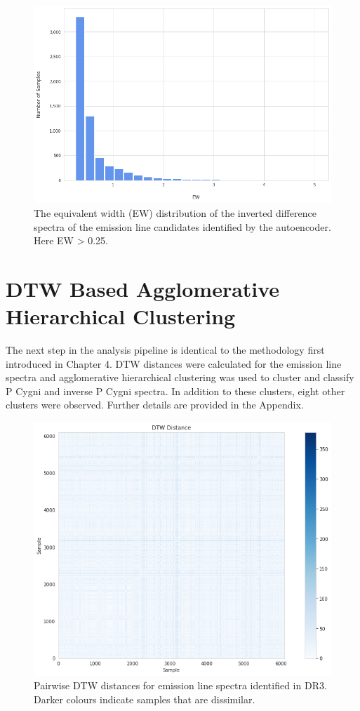\begin{figure}[!htb]
\centering
\includegraphics[scale=0.50]{figures/EW hist.png}
\caption{The equivalent width (EW) distribution of the inverted difference spectra of the emission line candidates identified by the autoencoder. Here EW > 0.25.}
\end{figure}

\section{DTW Based Agglomerative Hierarchical Clustering}

The next step in the analysis pipeline is identical to the methodology first introduced in Chapter 4. DTW distances were calculated for the emission line spectra and agglomerative hierarchical clustering was used to cluster and classify P Cygni and inverse P Cygni spectra. In addition to these clusters, eight other clusters were observed. Further details are provided in the Appendix.

\begin{figure}[!htb]
\centering
\includegraphics[scale=0.45]{figures/dtw distances dr3.png}
\caption{Pairwise DTW distances for emission line spectra identified in DR3. Darker colours indicate samples that are dissimilar.}
\end{figure}


